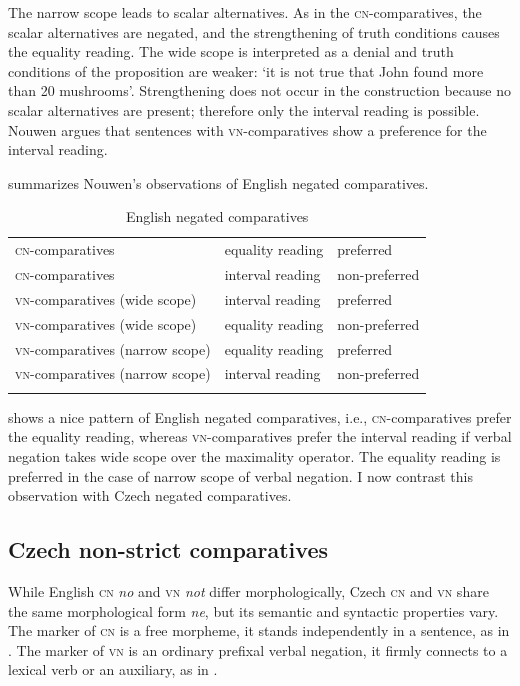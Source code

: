 \documentclass[output=paper,
]{langscibook}
\begin{document}
\noindent The narrow scope leads to scalar alternatives. As in the \textsc{cn-}comparatives, the scalar alternatives are negated, and the strengthening of truth conditions causes the equality reading. The wide scope is interpreted as a denial and truth conditions of the proposition are weaker: `it is not true that John found more than 20 mushrooms'. Strengthening does not occur in the construction because no scalar alternatives are present; therefore only the interval reading is possible. Nouwen argues that sentences with \textsc{vn-}comparatives show a preference for the interval reading. 

 summarizes Nouwen's observations of English negated comparatives.

\begin{table}
\caption{English negated comparatives}
\label{tab:1:eng_comp}
 \begin{tabular}{lll} 
  \lsptoprule
  \textsc{cn-}comparatives & equality reading & preferred\\
  \textsc{cn-}comparatives & interval reading & non-preferred\\
   \textsc{vn-}comparatives (wide scope) & interval reading & preferred\\
    \textsc{vn-}comparatives (wide scope) & equality reading & non-preferred\\
  \textsc{vn-}comparatives (narrow scope) & equality reading & preferred\\
  \textsc{vn-}comparatives (narrow scope) & interval reading & non-preferred\\
\lspbottomrule 
 
  \end{tabular}
  \end{table}
  

 shows a nice pattern of English negated comparatives, i.e., \textsc{cn-}comparatives prefer the equality reading, whereas \textsc{vn-}comparatives prefer the interval reading if verbal negation takes wide scope over the maximality operator. The equality reading is preferred in the case of narrow scope of verbal negation. I now contrast this observation with Czech negated comparatives.


\subsection{Czech non-strict comparatives}

While English \textsc{cn} \textit{no} and \textsc{vn} \textit{not} differ morphologically,  Czech \textsc{cn} and \textsc{vn} share the same morphological form \textit{ne}, but its semantic and syntactic properties vary. The marker of \textsc{cn} is a free morpheme, it stands independently in a sentence, as in . The marker of \textsc{vn} is an ordinary prefixal verbal negation, it firmly connects to a lexical verb or an auxiliary, as in .
\end{document}
